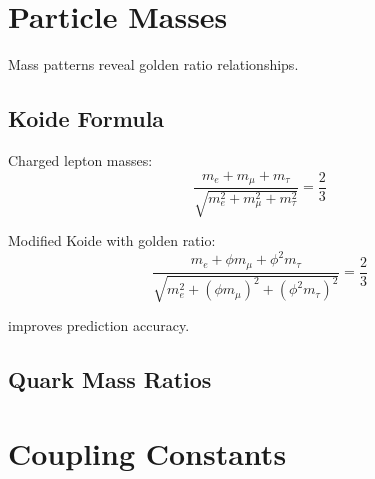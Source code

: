 \section{Particle Masses}

Mass patterns reveal golden ratio relationships.

\subsection{Koide Formula}

\begin{definition}
\label{def:koide}
Charged lepton masses:
\begin{equation}
\frac{m_e + m_\mu + m_\tau}{\sqrt{m_e^2 + m_\mu^2 + m_\tau^2}} = \frac{2}{3}
\end{equation}
\end{definition}

\begin{proposition}
\label{prop:golden-koide}
Modified Koide with golden ratio:
\begin{equation}
\frac{m_e + \phi m_\mu + \phi^2 m_\tau}{\sqrt{m_e^2 + (\phi m_\mu)^2 + (\phi^2 m_\tau)^2}} = \frac{2}{3}
\end{equation}

improves prediction accuracy.
\end{proposition}

\subsection{Quark Mass Ratios}

\begin{table}[h]
\centering
\caption{Quark Mass Ratios}
\end{table}

\section{Coupling Constants}

